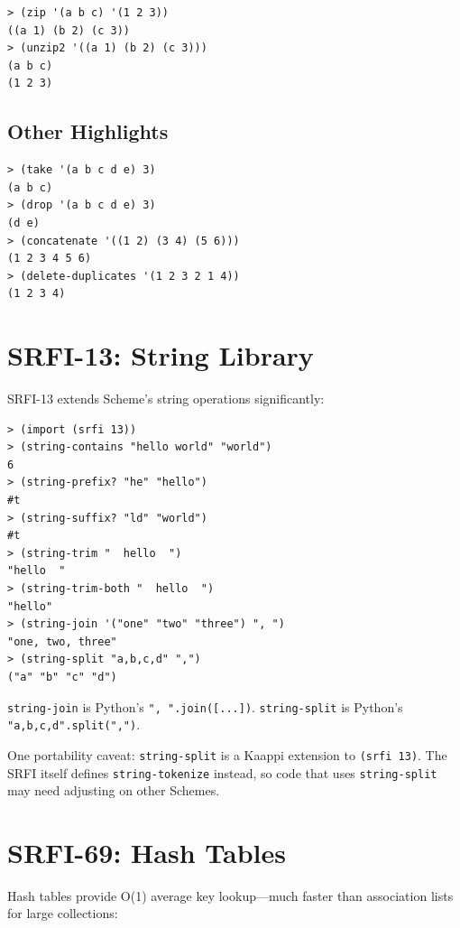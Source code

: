 \begin{lstlisting}[style=repl]
> (zip '(a b c) '(1 2 3))
((a 1) (b 2) (c 3))
> (unzip2 '((a 1) (b 2) (c 3)))
(a b c)
(1 2 3)
\end{lstlisting}

\subsection{Other Highlights}

\begin{lstlisting}[style=repl]
> (take '(a b c d e) 3)
(a b c)
> (drop '(a b c d e) 3)
(d e)
> (concatenate '((1 2) (3 4) (5 6)))
(1 2 3 4 5 6)
> (delete-duplicates '(1 2 3 2 1 4))
(1 2 3 4)
\end{lstlisting}

\section{SRFI-13: String Library}

SRFI-13 extends Scheme's string operations significantly:

\begin{lstlisting}[style=repl]
> (import (srfi 13))
> (string-contains "hello world" "world")
6
> (string-prefix? "he" "hello")
#t
> (string-suffix? "ld" "world")
#t
> (string-trim "  hello  ")
"hello  "
> (string-trim-both "  hello  ")
"hello"
> (string-join '("one" "two" "three") ", ")
"one, two, three"
> (string-split "a,b,c,d" ",")
("a" "b" "c" "d")
\end{lstlisting}

\begin{note}
\texttt{string-join} is Python's
\texttt{", ".join([...])}.
\texttt{string-split} is Python's
\texttt{"a,b,c,d".split(",")}.
\end{note}

One portability caveat: \texttt{string-split} is a Kaappi extension to \texttt{(srfi 13)}. The SRFI itself defines \texttt{string-tokenize} instead, so code that uses \texttt{string-split} may need adjusting on other Schemes.

\section{SRFI-69: Hash Tables}

Hash tables provide O(1) average key lookup---much faster than association lists for large collections:

